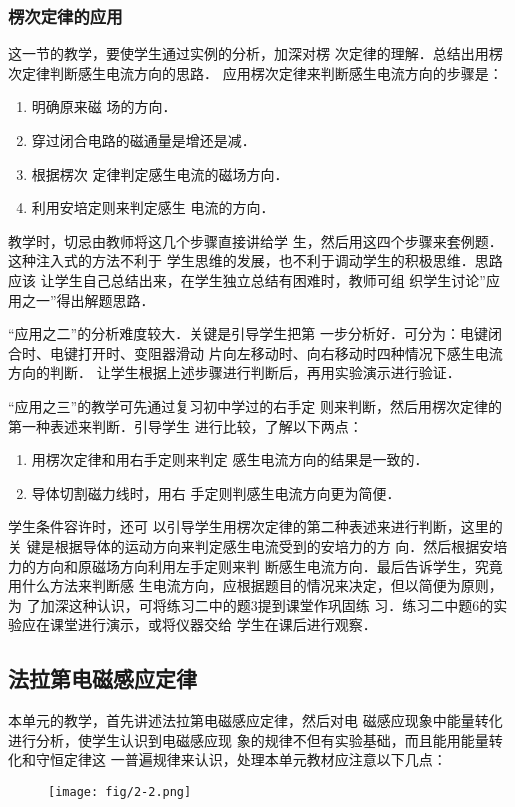 \subsubsection{楞次定律的应用}
这一节的教学，要使学生通过实例的分析，加深对楞
次定律的理解．总结出用楞次定律判断感生电流方向的思路．
应用楞次定律来判断感生电流方向的步骤是：
\begin{enumerate}
\item 明确原来磁
场的方向．
\item 穿过闭合电路的磁通量是增还是减．
\item 根据楞次
定律判定感生电流的磁场方向．
\item 利用安培定则来判定感生
电流的方向．
\end{enumerate}
教学时，切忌由教师将这几个步骤直接讲给学
生，然后用这四个步骤来套例题．这种注入式的方法不利于
学生思维的发展，也不利于调动学生的积极思维．思路应该
让学生自己总结出来，在学生独立总结有困难时，教师可组
织学生讨论”应用之一”得出解题思路．

“应用之二”的分析难度较大．关键是引导学生把第
一步分析好．可分为：电键闭合时、电键打开时、变阻器滑动
片向左移动时、向右移动时四种情况下感生电流方向的判断．
让学生根据上述步骤进行判断后，再用实验演示进行验证．

“应用之三”的教学可先通过复习初中学过的右手定
则来判断，然后用楞次定律的第一种表述来判断．引导学生
进行比较，了解以下两点：
\begin{enumerate}
 \item 用楞次定律和用右手定则来判定
感生电流方向的结果是一致的．
\item 导体切割磁力线时，用右
手定则判感生电流方向更为简便．   
\end{enumerate}
学生条件容许时，还可
以引导学生用楞次定律的第二种表述来进行判断，这里的关
键是根据导体的运动方向来判定感生电流受到的安培力的方
向．然后根据安培力的方向和原磁场方向利用左手定则来判
断感生电流方向．最后告诉学生，究竟用什么方法来判断感
生电流方向，应根据题目的情况来决定，但以简便为原则，为
了加深这种认识，可将练习二中的题3提到课堂作巩固练
习．练习二中题6的实验应在课堂进行演示，或将仪器交给
学生在课后进行观察．

\subsection{法拉第电磁感应定律}
本单元的教学，首先讲述法拉第电磁感应定律，然后对电
磁感应现象中能量转化进行分析，使学生认识到电磁感应现
象的规律不但有实验基础，而且能用能量转化和守恒定律这
一普遍规律来认识，处理本单元教材应注意以下几点：
\begin{figure}[htp]
    \centering
\texttt{[image: fig/2-2.png]}
    \caption{}
\end{figure}

